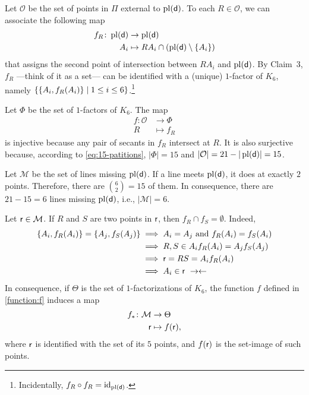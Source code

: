\begin{solution}
\begin{description}
        Let $\mathcal O$ be the set of points in $\Pi$ external to $\operatorname{pl}(\mathsf d)$. To each $R\in\mathcal O$, we can associate the following map
        \begin{align*}
            f_R\colon\operatorname{pl}(\mathsf d)&\to\operatorname{pl}(\mathsf d)\\
            A_i&\mapsto RA_i\cap(\operatorname{pl}(\mathsf d)\setminus\{A_i\})
        \end{align*}
        that assigns the second point of intersection between $RA_i$ and $\operatorname{pl}(\mathsf d)$. By Claim~3, $f_R$ ---think of it as a set--- can be identified with a (unique) $1$-factor of $K_6$, namely $\{\{A_i,f_R(A_i)\}\mid 1\le i\le 6\}$.\footnote{Incidentally, $f_R\circ f_R=\operatorname{id}_{\operatorname{pl}(\mathsf d)}$.}

        Let $\Phi$ be the set of $1$-factors of $K_6$. The map
        \begin{align}\label{function:f}
            f\colon\mathcal O&\to\Phi\\
            R&\mapsto f_R
        \end{align}
        is injective because any pair of secants in $f_R$ intersect at $R$. It is also surjective because, according to \eqref{eq:15-patitions}, $|\Phi|=15$ and $|\mathcal O|=21-|\operatorname{pl}(\mathsf d)|=15$.

        Let $\mathcal M$ be the set of lines missing $\operatorname{pl}(\mathsf d)$. If a line meets $\operatorname{pl}(\mathsf d)$, it does at exactly $2$ points. Therefore, there are $\binom62=15$ of them. In consequence, there are $21-15=6$ lines missing $\operatorname{pl}(\mathsf d)$, i.e., $|\mathcal M|=6$.
        
        Let $\mathsf r\in\mathcal M$. If $R$ and $S$ are two points in $\mathsf r$, then $f_R\cap f_S=\emptyset$. Indeed,
        \begin{align*}
            \{A_i,f_R(A_i)\}=\{A_j,f_S(A_j)\}
                &\implies A_i=A_j \text{ and }f_R(A_i)=f_S(A_i)\\
                &\implies R,S\in A_if_R(A_i)=A_jf_S(A_j)\\
                &\implies \block r=RS=A_if_R(A_i)\\
                &\implies A_i\in\block r\ \noend
        \end{align*}
        In consequence, if $\Theta$ is the set of $1$-factorizations of $K_6$, the function $f$ defined in \eqref{function:f} induces a map
        \begin{align*}
            f_*\colon\mathcal M&\to\Theta\\
            \mathsf r&\mapsto f(\mathsf r),
        \end{align*}
        where $\mathsf r$ is identified with the set of its $5$ points, and $f(\mathsf r)$ is the set-image of such points.
        

\end{description}
\end{solution}
